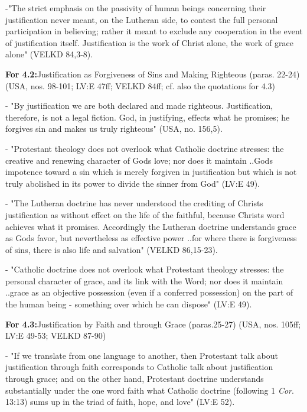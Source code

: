 -"The strict emphasis on the passivity of human beings concerning their
justification never meant, on the Lutheran side, to contest the full
personal participation in believing; rather it meant to exclude any
cooperation in the event of justification itself. Justification is the
work of Christ alone, the work of grace alone" (VELKD 84,3-8).

\textbf{For 4.2:}Justification as Forgiveness of Sins and Making
Righteous (paras. 22-24) (USA, nos. 98-101; LV:E 47ff; VELKD 84ff; cf.
also the quotations for 4.3)

- "By justification we are both declared and made righteous.
Justification, therefore, is not a legal fiction. God, in justifying,
effects what he promises; he forgives sin and makes us truly righteous"
(USA, no. 156,5).

- "Protestant theology does not overlook what Catholic doctrine
stresses: the creative and renewing character of God\textquotesingle s
love; nor does it maintain ..God\textquotesingle s impotence toward a
sin which is \textquotesingle merely\textquotesingle{} forgiven in
justification but which is not truly abolished in its power to divide
the sinner from God" (LV:E 49).

- "The Lutheran doctrine has never understood the
\textquotesingle crediting of Christ\textquotesingle s
justification\textquotesingle{} as without effect on the life of the
faithful, because Christ\textquotesingle s word achieves what it
promises. Accordingly the Lutheran doctrine understands grace as
God\textquotesingle s favor, but nevertheless as effective power
..\textquotesingle for where there is forgiveness of sins, there is also
life and salvation\textquotesingle" (VELKD 86,15-23).

- "Catholic doctrine does not overlook what Protestant theology
stresses: the personal character of grace, and its link with the Word;
nor does it maintain ..grace as an objective
\textquotesingle possession\textquotesingle{} (even if a conferred
possession) on the part of the human being - something over which he can
dispose" (LV:E 49).

\textbf{For 4.3:}Justification by Faith and through Grace (paras.25-27)
(USA, nos. 105ff; LV:E 49-53; VELKD 87-90)

- "If we translate from one language to another, then Protestant talk
about justification through faith corresponds to Catholic talk about
justification through grace; and on the other hand, Protestant doctrine
understands substantially under the one word
\textquotesingle faith\textquotesingle{} what Catholic doctrine
(following 1 \emph{Cor}. 13:13) sums up in the triad of
\textquotesingle faith, hope, and love\textquotesingle" (LV:E 52).


